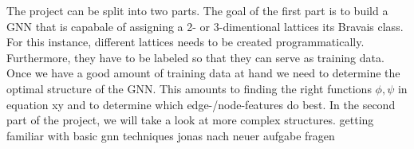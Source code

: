 The project can be split into two parts. The goal of the first part is to build a GNN that is capabale of assigning a 2- or 3-dimentional lattices its Bravais class. 
For this instance, different lattices needs to be created programmatically. Furthermore, they have to be labeled so that they can serve as training data.
Once we have a good amount of training data at hand we need to determine the optimal structure of the GNN. This amounts to finding the
right functions $\phi,\psi$ in equation xy and to determine which edge-/node-features do best.
In the second part of the project, we will take a look at more complex structures. getting familiar with basic gnn techniques
jonas nach neuer aufgabe fragen